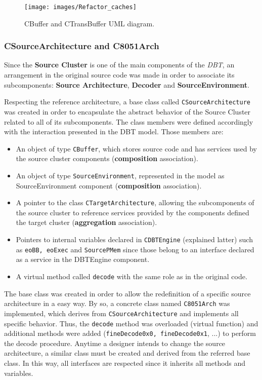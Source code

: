 \documentclass[12pt]{article}
\begin{document}
{\begin{figure}[H]
\centerline{
\texttt{[image: images/Refactor\_caches]}
}
\caption{CBuffer and CTransBuffer UML diagram.}
\label{fig:refactorcaches} 
\end{figure}


\subsubsection*{CSourceArchitecture and C8051Arch}

Since the \textbf{Source Cluster} is one of the main components of the \textit{DBT}, an arrangement in the original source code was made in order to associate its subcomponents: \textbf{Source Architecture}, \textbf{Decoder} and \textbf{SourceEnvironment}. 

Respecting the reference architecture, a base class called \texttt{CSourceArchitecture} was created in order to encapsulate the abstract behavior of the Source Cluster related to all of its subcomponents. The class members were defined accordingly with the interaction presented in the DBT model. Those members are:
\begin{itemize}
\item An object of type \texttt{CBuffer}, which stores source code and has services used by the source cluster components (\textbf{composition} association).
\item An object of type \texttt{SourceEnvironment}, represented in the model as SourceEnvironment component (\textbf{composition} association).
\item A pointer to the class \texttt{CTargetArchitecture}, allowing the subcomponents of the source cluster to reference services provided by the components defined the target cluster (\textbf{aggregation} association).
\item Pointers to internal variables declared in \texttt{CDBTEngine} (explained latter) such as \texttt{eoBB, eoExec} and \texttt{SourcePMem} since those belong to an interface declared as a service in the DBTEngine component.
\item A virtual method called \texttt{decode} with the same role as in the original code.
\end{itemize} 

The base class was created in order to allow the redefinition of a specific source architecture in a easy way. By so, a concrete class named \texttt{C8051Arch} was implemented, which derives from \texttt{CSourceArchitecture} and implements all specific behavior. Thus, the \texttt{decode} method was overloaded (virtual function) and additional methods were added (\texttt{fineDecode0x0, fineDecode0x1}, ...) to perform the decode procedure. Anytime a designer intends to change the source architecture, a similar class must be created and derived from the referred base class. In this way, all interfaces are respected since it inherits all methods and variables.

}
\end{document}
